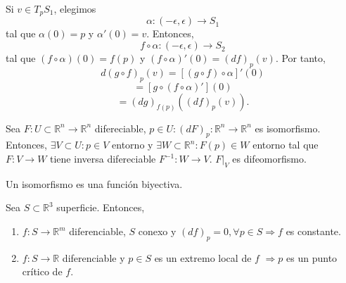 \begin{dem}
  Si $ v \in T_{p}S_{1}$, elegimos
  \[
    \alpha : (-\epsilon, \epsilon) \to S_{1}
  \]
  tal que $\alpha(0) = p$ y $\alpha'(0) = v$. Entonces,
  \[
    f \circ \alpha : (-\epsilon, \epsilon) \to S_{2}
  \]
  tal que $(f \circ \alpha)(0) = f(p)$ y $(f \circ \alpha)'(0) = (d f)_{p}(v)$. Por tanto,
  \[
    d(g \circ f)_{p}(v) = [(g \circ f) \circ \alpha]'(0)
  \] 
  \[ 
    = [g \circ ( f \circ \alpha)'](0)
  \] 
  \[ 
    = (d g)_{f(p)}((d f)_{p}(v)).
  \] 
\end{dem}

%

\begin{theo}
  Sea $F : U \subset \mathbb{R}^{n} \to \mathbb{R}^{n}$ difereciable, $p \in U : (d F)_{p} : \mathbb{R}^{n} \to \mathbb{R}^{n}$ es isomorfismo. Entonces, $\exists V \subset U :  p \in V$ entorno y $\exists W \subset \mathbb{R}^{n} : F(p) \in W$ entorno tal que $F : V \to W$ tiene inversa difereciable $F^{-1} : W \to V$. $F|_{V}$ es difeomorfismo.
\end{theo}

\begin{obs}
  Un isomorfismo es una función biyectiva.
\end{obs}

\begin{prop}
  Sea $S \subset \mathbb{R}^{3}$ superficie. Entonces,
  \begin{enumerate}[label=(\roman*)]
    \item $f : S \to \mathbb{R}^{m}$ diferenciable, $S$ conexo y $(d f)_{p} = 0, \forall p \in S \Rightarrow f$ es constante.
    \item $f : S \to \mathbb{R}$ diferenciable y $p \in S$ es un extremo local de $f$ $\Rightarrow p$ es un punto crítico de $f$.
  \end{enumerate}
\end{prop}

